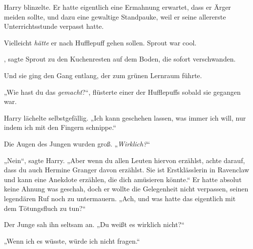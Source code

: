 Harry blinzelte. Er hatte eigentlich eine Ermahnung erwartet, dass er Ärger meiden sollte, und dazu eine gewaltige Standpauke, weil er seine allererste Unterrichtsstunde verpasst hatte.

Vielleicht \emph{hätte} er nach Hufflepuff gehen sollen. Sprout war cool.

, sagte Sprout zu den Kuchenresten auf dem Boden, die sofort verschwanden.

Und sie ging den Gang entlang, der zum grünen Lernraum führte.

„Wie hast du das \emph{gemacht}?“, flüsterte einer der Hufflepuffs sobald sie gegangen war.

Harry lächelte selbstgefällig. „Ich kann geschehen lassen, was immer ich will, nur indem ich mit den Fingern schnippe.“

Die Augen des Jungen wurden groß. „\emph{Wirklich?}“

„Nein“, sagte Harry. „Aber wenn du allen Leuten hiervon erzählst, achte darauf, dass du auch Hermine Granger davon erzählst. Sie ist Erstklässlerin in Ravenclaw und kann eine Anekdote erzählen, die dich amüsieren könnte.“ Er hatte absolut keine Ahnung was geschah, doch er wollte die Gelegenheit nicht verpassen, seinen legendären Ruf noch zu untermauern. „Ach, und was hatte das eigentlich mit dem Tötungsfluch zu tun?“

Der Junge sah ihn seltsam an. „Du weißt es wirklich nicht?“

„Wenn ich es wüsste, würde ich nicht fragen.“

